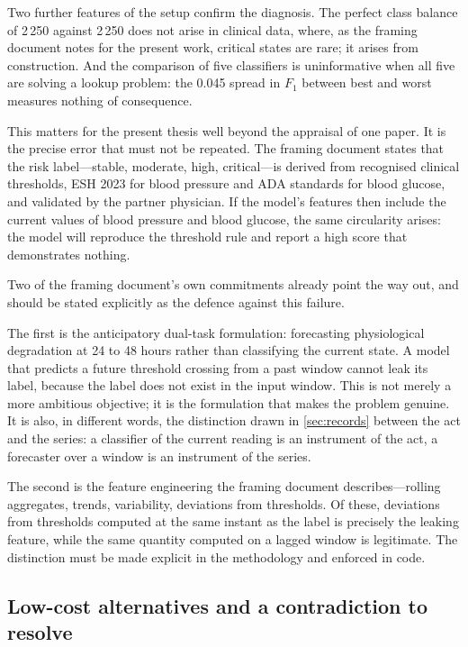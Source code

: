 \documentclass[12pt,a4paper,oneside]{report}
\begin{document}
Two further features of the setup confirm the diagnosis. The perfect class balance of 2\,250 against 2\,250 does not arise in clinical data, where, as the framing document notes for the present work, critical states are rare; it arises from construction. And the comparison of five classifiers is uninformative when all five are solving a lookup problem: the 0.045 spread in $F_1$ between best and worst measures nothing of consequence.

This matters for the present thesis well beyond the appraisal of one paper. It is the precise error that must not be repeated. The framing document states that the risk label---stable, moderate, high, critical---is derived from recognised clinical thresholds, ESH 2023 for blood pressure and ADA standards for blood glucose, and validated by the partner physician. If the model's features then include the current values of blood pressure and blood glucose, the same circularity arises: the model will reproduce the threshold rule and report a high score that demonstrates nothing.

Two of the framing document's own commitments already point the way out, and should be stated explicitly as the defence against this failure.

The first is the anticipatory dual-task formulation: forecasting physiological degradation at 24 to 48 hours rather than classifying the current state. A model that predicts a future threshold crossing from a past window cannot leak its label, because the label does not exist in the input window. This is not merely a more ambitious objective; it is the formulation that makes the problem genuine. It is also, in different words, the distinction drawn in \cref{sec:records} between the act and the series: a classifier of the current reading is an instrument of the act, a forecaster over a window is an instrument of the series.

The second is the feature engineering the framing document describes---rolling aggregates, trends, variability, deviations from thresholds. Of these, deviations from thresholds computed at the same instant as the label is precisely the leaking feature, while the same quantity computed on a lagged window is legitimate. The distinction must be made explicit in the methodology and enforced in code.

\subsection{Low-cost alternatives and a contradiction to resolve}\label{sec:lowcost}
\end{document}
